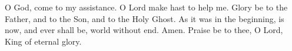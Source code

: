 \rubric{\Vbar}O God, come to my assistance. O Lord make hast to help me. Glory be to the Father, and to the Son, \rubric{\GreStar} and to the Holy Ghost. As it was in the beginning, is now, \rubric{\GreStar} and ever shall be, world without end. Amen. Praise be to thee, O Lord, King of eternal glory.